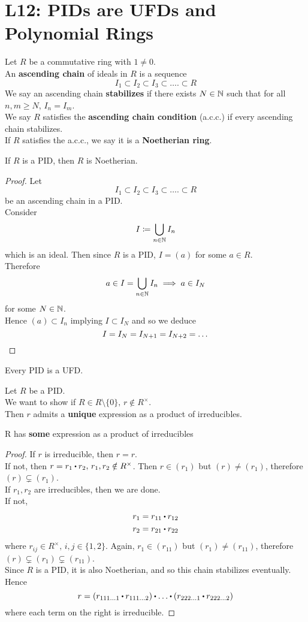 \documentclass[../Main.tex]{subfiles}
\begin{document}
\chapter{L12: PIDs are UFDs and Polynomial Rings}
\begin{dfn}[title = {Ascending Chains, Noetherian Ring}]
	Let $R$ be a commutative ring with $1\ne 0$.\\
	An \textbf{ascending chain} of ideals in $R$ is a sequence
	\[I_1\subset I_2\subset I_3\subset\dots.\subset R\]
	We say an ascending chain \textbf{stabilizes} if there exists $N\in \mathbb{N}$ such that for all $n,m \ge N$, $I_n=I_m$.\\
	We say $R$ satisfies the \textbf{ascending chain condition} (a.c.c.) if every ascending chain stabilizes.\\
	If $R$ satisfies the a.c.c., we say it is a \textbf{Noetherian ring}.
\end{dfn}
\begin{thm}[title = PID is Noetherian]
	If $R$ is a PID, then $R$ is Noetherian.
\end{thm}
\begin{proof}
	Let
	\[I_1\subset I_2\subset I_3\subset\dots.\subset R\]
	be an ascending chain in a PID.\\
	Consider
	\[I\coloneqq \bigcup\limits_{n\in \mathbb{N}} I_n\]
	which is an ideal. Then since $R$ is a PID, $I=(a)$ for some $a\in R$.\\
	Therefore
	\[a\in I =\bigcup\limits_{n\in \mathbb{N}} I_n\implies a\in I_N \]
	for some $N\in \mathbb{N}$.\\
	Hence $(a)\subset I_n$ implying $I\subset I_N$ and so we deduce
	\[I=I_N=I_{N+1}=I_{N+2}=\dots\qedhere\]
\end{proof}
\begin{thm}[title = PID IS UFD]
	Every PID is a UFD.
\end{thm}
Let $R$ be a PID.\\
We want to show if $R\in R\setminus \{0\},\, r\notin R^\times$.\\
Then $r$ admits a \textbf{unique} expression as a product of irreducibles.
\begin{lem}
	R has \textbf{some} expression as a product of irreducibles
\end{lem}
\begin{proof}
	If $r$ is irreducible, then $r=r$.\\
	If not, then $r=r_1\rdot r_2,\, r_1,r_2\notin R^\times$. Then $r\in (r_1)$ but $(r)\ne (r_1)$, therefore $(r)\subsetneq (r_1)$.\\
	If $r_1,r_2$ are irreducibles, then we are done.\\
	If not, 
	\begin{align*}
	r_1=r_{11}\rdot r_{12}\\
	r_2=r_{21}\rdot r_{22}
	\end{align*}
	where $r_{ij}\in R^\times,\, i,j\in \{1,2\}$. Again, $r_1\in (r_{11})$ but $(r_1)\ne (r_{11})$, therefore $(r)\subsetneq (r_1)\subsetneq (r_{11})$.\\
	Since $R$ is a PID, it is also Noetherian, and so this chain stabilizes eventually. Hence
	\[r=(r_{111\dots1}\rdot r_{111\dots 2})\rdot \dots \rdot (r_{222\dots1}\rdot r_{222\dots 2})\]
	where each term on the right is irreducible.
\end{proof}
\end{document}
